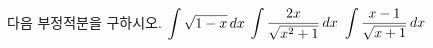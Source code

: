다음 부정적분을 구하시오.
 $\displaystyle\int\sqrt{1-x}\mkern3mu dx$
 $\displaystyle\int\dfrac{2x}{\sqrt{x^2+1}}\mkern3mu dx$
 $\displaystyle\int\dfrac{x-1}{\sqrt{x+1}}\mkern3mu dx$

